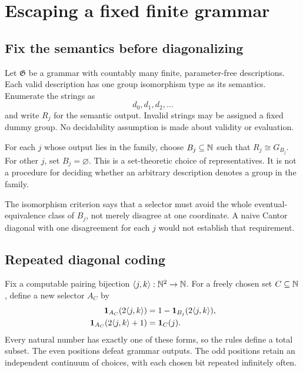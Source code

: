 \chapter{Escaping a fixed finite grammar}
\label{ch:grammar}

\section{Fix the semantics before diagonalizing}
Let $\mathfrak G$ be a grammar with countably many finite, parameter-free descriptions. Each valid description has one group isomorphism type as its semantics. Enumerate the strings as
\[
d_0,d_1,d_2,\ldots
\]
and write $R_j$ for the semantic output. Invalid strings may be assigned a fixed dummy group. No decidability assumption is made about validity or evaluation.

For each $j$ whose output lies in the family, choose $B_j\subseteq\mathbb N$ such that $R_j\cong G_{B_j}$. For other $j$, set $B_j=\varnothing$. This is a set-theoretic choice of representatives. It is not a procedure for deciding whether an arbitrary description denotes a group in the family.

The isomorphism criterion says that a selector must avoid the whole eventual-equivalence class of $B_j$, not merely disagree at one coordinate. A naive Cantor diagonal with one disagreement for each $j$ would not establish that requirement.

\section{Repeated diagonal coding}
Fix a computable pairing bijection $\langle j,k\rangle:\mathbb N^2\to\mathbb N$. For a freely chosen set $C\subseteq\mathbb N$, define a new selector $A_C$ by
\begin{align}
\mathbf 1_{A_C}(2\langle j,k\rangle)
 &=1-\mathbf 1_{B_j}(2\langle j,k\rangle),\label{eq:diageven}\\
\mathbf 1_{A_C}(2\langle j,k\rangle+1)
 &=\mathbf 1_C(j).\label{eq:diagodd}
\end{align}
Every natural number has exactly one of these forms, so the rules define a total subset. The even positions defeat grammar outputs. The odd positions retain an independent continuum of choices, with each chosen bit repeated infinitely often.

